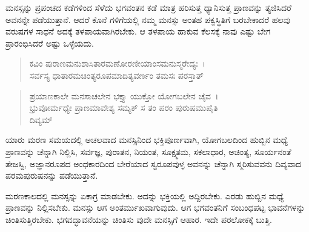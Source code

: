 ಮನಸ್ಸನ್ನು ಪ್ರಪಂಚದ ಕಡೆಗಳಿಂದ ಸೆಳೆದು ಭಗವಂತನ ಕಡೆ ಮಾತ್ರ ಹರಿಸುತ್ತ ಧ್ಯಾನಿಸುತ್ತ ಪ್ರಾಣವನ್ನು ತ್ಯಜಿಸಿದರೆ ಅವನನ್ನೇ ಪಡೆಯುತ್ತಾನೆ. ಆದರೆ ಕೊನೆ ಗಳಿಗೆಯಲ್ಲಿ ನಮ್ಮ ಮನಸ್ಸು ಅಂತಹ ಪಕ್ವಸ್ಥಿತಿಗೆ ಬರಬೇಕಾದರೆ ಹಲವು ವರುಷಗಳ ಸಾಧನೆ ಅದಕ್ಕೆ ತಳಪಾಯವಾಗಿರಬೇಕು. ಆ ತಳಪಾಯ ಹಾಕುವ ಕೆಲಸಕ್ಕೆ ನಾವು ಎಷ್ಟು ಬೇಗ ಪ್ರಾರಂಭಿಸಿದರೆ ಅಷ್ಟು ಒಳ್ಳೆಯದು.

\begin{verse}
ಕವಿಂ ಪುರಾಣಮನುಶಾಸಿತಾರಮಣೋರಣೀಯಾಂಸಮನುಸ್ಮರೇದ್ಯಃ~।\\ಸರ್ವಸ್ಯ ಧಾತಾರಮಚಿಂತ್ಯರೂಪಮಾದಿತ್ಯವರ್ಣಂ ತಮಸಃ ಪರಸ್ತಾತ್ 
\end{verse}

\begin{verse}
ಪ್ರಯಾಣಕಾಲೇ ಮನಸಾಚಲೇನ ಭಕ್ತ್ಯಾ ಯುಕ್ತೋ ಯೋಗಬಲೇನ ಚೈವ~।\\ಭ್ರುವೋರ್ಮಧ್ಯೇ ಪ್ರಾಣಮಾವೇಶ್ಯ ಸಮ್ಯಕ್ ಸ ತಂ ಪರಂ ಪುರುಷಮುಪೈತಿ\\ ದಿವ್ಯಮ್ 
\end{verse}

{\small ಯಾರು ಮರಣ ಸಮಯದಲ್ಲಿ ಅಚಲವಾದ ಮನಸ್ಸಿನಿಂದ ಭಕ್ತಿಪೂರ್ಣವಾಗಿ, ಯೋಗಬಲದಿಂದ ಹುಬ್ಬಿನ ಮಧ್ಯೆ ಪ್ರಾಣವನ್ನು ಚೆನ್ನಾಗಿ ನಿಲ್ಲಿಸಿ, ಸರ್ವಜ್ಞ, ಪುರಾತನ, ನಿಯಂತ, ಸೂಕ್ಷ್ಮತಮ, ಸಕಲಾಧಾರ, ಅಚಿಂತ್ಯ, ಸೂರ್ಯನಂತೆ ತೇಜಸ್ವಿ, ಅಜ್ಞಾನರೂಪದ ಅಂಧಕಾರದಿಂದ ಬೇರೆಯಾದ ಸ್ವರೂಪವುಳ್ಳ ಅವನನ್ನು ಚೆನ್ನಾಗಿ ಸ್ಮರಿಸುವವನು ದಿವ್ಯವಾದ ಪರಮಪುರುಷನನ್ನು ಪಡೆಯುತ್ತಾನೆ.}

ಮರಣಕಾಲದಲ್ಲಿ ಮನಸ್ಸನ್ನು ಏಕಾಗ್ರ ಮಾಡಬೇಕು. ಅದನ್ನು ಭಕ್ತಿಯಲ್ಲಿ ಅದ್ದಿರಬೇಕು. ಎರಡು ಹುಬ್ಬಿನ ಮಧ್ಯೆ ಪ್ರಾಣವನ್ನು ನಿಲ್ಲಿಸಬೇಕು. ಮನಸ್ಸು ಆಗ ಅಂತರ್ಮುಖವಾಗುವುದು. ಆಗ ಭಗವಂತನಿಗೆ ಸಂಬಂಧಪಟ್ಟ ಭಾವನೆಗಳನ್ನು ಚಿಂತಿಸುತ್ತಿರಬೇಕು. ಭಗವದ್ಭಾವನೆಯನ್ನು ಚಿಂತಿಸು ವುದೇ ಮನಸ್ಸಿಗೆ ಆಹಾರ. ಇದೇ ಪರಲೋಕಕ್ಕೆ ಬುತ್ತಿ.

